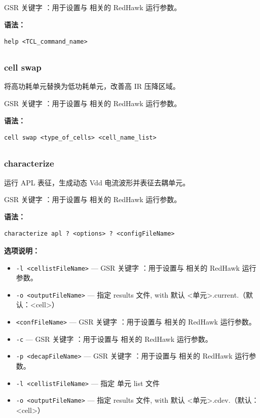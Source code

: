 GSR 关键字 ：用于设置与  相关的 RedHawk 运行参数。

\textbf{语法：}
\begin{lstlisting}
help <TCL_command_name>
\end{lstlisting}

\subsection{}
\subsubsection*{cell swap}

将高功耗单元替换为低功耗单元，改善高 IR 压降区域。

GSR 关键字 ：用于设置与  相关的 RedHawk 运行参数。

\textbf{语法：}
\begin{lstlisting}
cell swap <type_of_cells> <cell_name_list>
\end{lstlisting}

\subsection{}
\subsubsection*{characterize}

运行 APL 表征，生成动态 Vdd 电流波形并表征去耦单元。

GSR 关键字 ：用于设置与  相关的 RedHawk 运行参数。

\textbf{语法：}
\begin{lstlisting}
characterize apl ? <options> ? <configFileName>
\end{lstlisting}

\textbf{选项说明：}
\begin{itemize}
\item \texttt{-l <cellistFileName>} — GSR 关键字 ：用于设置与  相关的 RedHawk 运行参数。
\item \texttt{-o <outputFileName>} — 指定 results 文件, with 默认 <单元>.current.（默认：<cell>）
\item \texttt{<confFileName>} — GSR 关键字 ：用于设置与  相关的 RedHawk 运行参数。
\item \texttt{-c} — GSR 关键字 ：用于设置与  相关的 RedHawk 运行参数。
\item \texttt{-p <decapFileName>} — GSR 关键字 ：用于设置与  相关的 RedHawk 运行参数。
\item \texttt{-l <cellistFileName>} — 指定 单元 list 文件
\item \texttt{-o <outputFileName>} — 指定 results 文件, with 默认 <单元>.cdev.（默认：<cell>）
\end{itemize}

